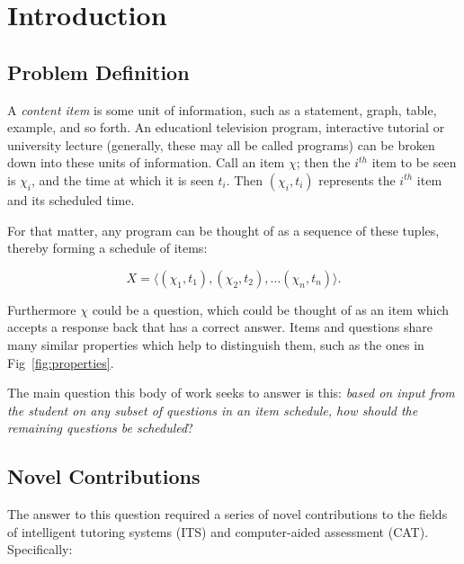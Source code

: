 
\section{Introduction}

\subsection{Problem Definition}

A \emph{content item} is some unit of information, such as a statement, graph,
table, example, and so forth.  An educationl television program, interactive
tutorial or university lecture (generally, these may all be called programs)
can be broken down into these units of information.  Call an item $\chi$; then
the $i^{th}$ item to be seen is $\chi_i$, and the time at which it is seen
$t_i$.  Then $(\chi_i, t_i)$ represents the $i^{th}$ item and its scheduled
time.  

For that matter, any program can be thought of as a sequence of these tuples,
thereby forming a schedule of items: 

\begin{equation}
\label{eq:schedule}
   X = \langle (\chi_1, t_1), (\chi_2, t_2), \ldots (\chi_n, t_n) \rangle.
\end{equation}
\vspace{2pt}

Furthermore $\chi$ could be a question, which could be thought of as an item
which accepts a response back that has a correct answer.  Items and questions
share many similar properties which help to distinguish them, such as the
ones in Fig~\ref{fig:properties}.

The main question this body of work seeks to answer is this: \emph{based on
input from the student on any subset of questions in an item schedule, how
should the remaining questions be scheduled}?

\subsection{Novel Contributions}

The answer to this question required a series of novel contributions to the
fields of intelligent tutoring systems (ITS) and computer-aided assessment
(CAT).  Specifically:

